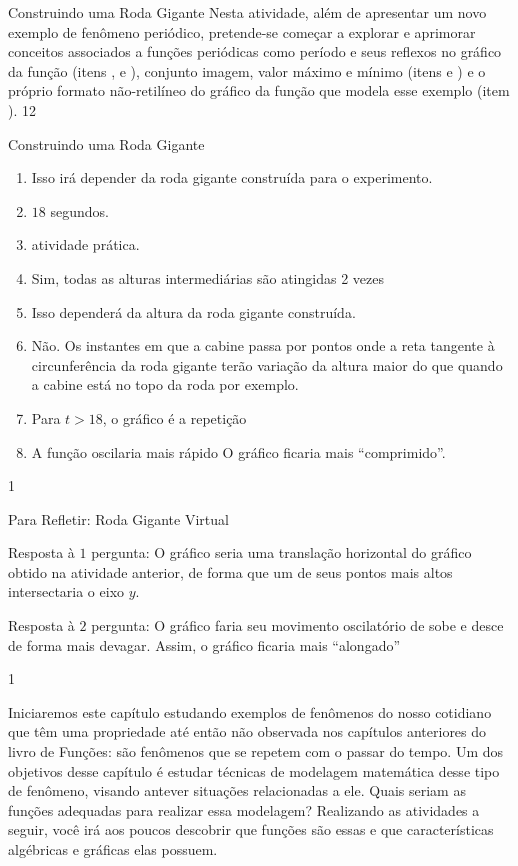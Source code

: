 \begin{sugestions}{Construindo uma Roda Gigante}
{
Nesta atividade, além de apresentar um novo exemplo de
fenômeno periódico, pretende-se começar a explorar e
aprimorar conceitos associados a funções periódicas como
período e seus reflexos no gráfico da função (itens ,  e ), conjunto imagem, valor máximo e mínimo (itens  e
) e o próprio formato não-retilíneo do gráfico da função
que modela esse exemplo (item ).
}{1}{2}
\end{sugestions}
\clearmargin
\marginpar{\vspace{.5em}}
\begin{answer}{Construindo uma Roda Gigante}
{
\begin{enumerate}
\item Isso irá depender da roda gigante construída para o
experimento.
\item $18$ segundos.
\item atividade prática.
\item Sim, todas as alturas intermediárias são atingidas 2 vezes
\item Isso dependerá da altura da roda gigante construída.
\item Não. Os instantes em que a cabine passa por pontos onde a
reta tangente à circunferência da roda gigante terão variação
da altura maior do que quando a cabine está no topo da roda
por exemplo.
\item Para $t>18$, o gráfico é a repetição
\item A função oscilaria mais rápido O gráfico ficaria mais
“comprimido”.
\end{enumerate}
}{1}
\end{answer}
\clearmargin
\begin{answer}{Para Refletir: Roda Gigante Virtual}
{
Resposta à $1$ pergunta: O gráfico seria uma translação horizontal do gráfico obtido na atividade anterior, de forma que um de seus pontos mais altos intersectaria o eixo $y$.

Resposta à $2$ pergunta: O gráfico faria seu movimento oscilatório de sobe e desce de forma mais devagar. Assim, o gráfico ficaria mais “alongado”
}{1}
\end{answer}
\label{trig-exp1}

Iniciaremos este capítulo estudando exemplos de fenômenos do nosso cotidiano que têm uma propriedade até então não observada nos capítulos anteriores do livro de Funções: são fenômenos que se repetem com o passar do tempo. Um dos objetivos desse capítulo é estudar técnicas de modelagem matemática desse tipo de fenômeno, visando antever situações relacionadas a ele. Quais seriam as funções adequadas para realizar essa modelagem? Realizando as atividades a seguir, você irá aos poucos descobrir que funções são essas e que características algébricas e gráficas elas possuem.

